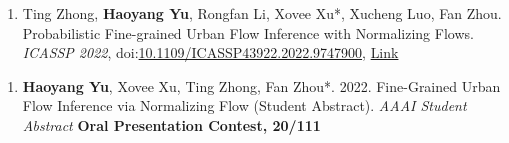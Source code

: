 

\begin{enumerate}[resume]
    \item Ting Zhong, \textbf{Haoyang Yu}, Rongfan Li, Xovee Xu*, Xucheng Luo, Fan Zhou. Probabilistic Fine-grained Urban Flow Inference with Normalizing Flows. \textit{ICASSP 2022}, doi:\href{papers/ICASSP_2022_FUFI.pdf}{10.1109/ICASSP43922.2022.9747900}, \href{https://ieeexplore.ieee.org/document/9747900
    }{Link}

\end{enumerate}


\begin{enumerate}[resume]
    \item \textbf{Haoyang Yu}, Xovee Xu, Ting Zhong, Fan Zhou*. 2022. Fine-Grained Urban Flow Inference via Normalizing Flow (Student Abstract). \textit{AAAI Student Abstract}
    \newline \textbf{\color{red}Oral Presentation Contest, 20/111}
\end{enumerate}